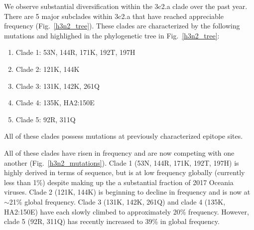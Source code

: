 \documentclass[11pt,oneside,letterpaper]{article}
\newcommand{\FIG}[1]{Fig.~\ref{#1}}
\begin{document}
We observe substantial diversification within the 3c2.a clade over the
past year. There are 5 major subclades within 3c2.a that have reached
appreciable frequency (\FIG{h3n2_tree}). These clades are characterized by the following
mutations and highlighed in the phylogenetic tree in \FIG{h3n2_tree}:

\begin{enumerate}
\item  Clade 1: 53N, 144R, 171K, 192T, 197H
\item  Clade 2: 121K, 144K
\item  Clade 3: 131K, 142K, 261Q
\item  Clade 4: 135K, HA2:150E
\item  Clade 5: 92R, 311Q
\end{enumerate}

All of these clades possess mutations at previously characterized
epitope sites.

All of these clades have risen in frequency and are now competing with
one another (\FIG{h3n2_mutations}). Clade 1 (53N, 144R, 171K, 192T, 197H) is highly derived in
terms of sequence, but is at low frequency globally (currently less than
1\%) despite making up the a substantial fraction of 2017 Oceania
viruses. Clade 2 (121K, 144K) is beginning to decline in frequency and
is now at $\sim$21\% global frequency. Clade 3 (131K, 142K,
261Q) and clade 4 (135K, HA2:150E) have each slowly climbed to
approximately 20\% frequency. However, clade 5 (92R, 311Q) has recently
increased to 39\% in global frequency.
\end{document}
